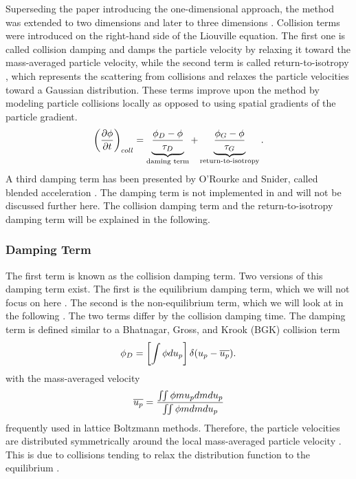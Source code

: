 Superseding the paper introducing the one-dimensional approach, the \MP method was extended to two dimensions \cite{MP2d} and later to three dimensions \cite{MPInterpolation}.
Collision terms were introduced on the right-hand side of the Liouville equation. The first one is called collision damping \cite{damp} and damps the particle velocity by relaxing it toward the mass-averaged particle velocity, while the second term is called return-to-isotropy \cite{isotropy}, which represents the scattering from collisions and relaxes the particle velocities toward a Gaussian distribution.
These terms improve upon the \MP method by modeling particle collisions locally as opposed to using spatial gradients of the particle gradient.
\begin{equation}
    \left( \frac{\partial \phi}{\partial t} \right)_{coll} = \underbrace{\dfrac{\phi_D - \phi}{\tau_D}}_{\text{daming term}} + \underbrace{\dfrac{\phi_G - \phi}{\tau_G}}_{\text{return-to-isotropy}}.
\end{equation}
A third damping term has been presented by O'Rourke and Snider, called blended acceleration \cite{thirdDamp}. The damping term is not implemented in \OF and will not be discussed further here.
The collision damping term and the return-to-isotropy damping term will be explained in the following. 

\subsubsection{Damping Term}
\label{sec:damping}
The first term is known as the collision damping term. 
Two versions of this damping term exist.
The first is the equilibrium damping term, which we will not focus on here \cite{dampUnimproved}.
The second is the non-equilibrium term, which we will look at in the following \cite{damp}.
The two terms differ by the collision damping time.
The damping term is defined similar to a Bhatnagar,
Gross, and Krook (BGK) collision term 
\begin{equation}
    \label{eq:colDamp}
    \phi_D = \left[ \int \phi d u_p \right] \delta (u_p - \overline{u_p}).
\end{equation}
with the mass-averaged velocity
\begin{equation}
\label{eq:meanPartVel}
    \nup = \dfrac{\MultiIntegral{2}  \pd \m \up d \m d  \up}{\MultiIntegral{2} \pd \m d \m d \up}
\end{equation}
frequently used in lattice Boltzmann methods.
Therefore, the particle velocities are distributed symmetrically around the local mass-averaged particle velocity \nup. This is due to collisions tending to relax the distribution function to the equilibrium \pdd.

